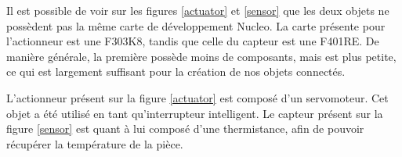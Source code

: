 Il est possible de voir sur les figures \ref{actuator} et \ref{sensor} que les deux objets ne possèdent pas la 
même carte de développement Nucleo. La carte présente pour l'actionneur est une F303K8, tandis que celle du 
capteur est une F401RE. De manière générale, la première possède moins de composants, mais est plus petite, 
ce qui est largement suffisant pour la création de nos objets connectés.

L'actionneur présent sur la figure \ref{actuator} est composé d'un servomoteur. Cet objet a été utilisé en 
tant qu'interrupteur intelligent. Le capteur présent sur la figure \ref{sensor} est quant à lui composé d'une 
thermistance, afin de pouvoir récupérer la température de la pièce.



